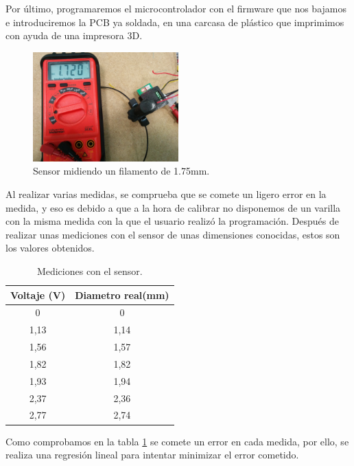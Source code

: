 Por último, programaremos el microcontrolador con el firmware que nos bajamos e introduciremos la PCB ya soldada, en una carcasa de plástico que imprimimos con ayuda de una impresora 3D.
\begin{figure}[H]
    \centering
    \includegraphics[width=0.5\textwidth]{images/sensor/IMG_20150417_134451.jpg}
    \caption{Sensor midiendo un filamento de 1.75mm.}
    \label{fig:sens_midiendo}
\end{figure}

Al realizar varias medidas, se comprueba que se comete un ligero error en la medida, y eso es debido a que a la hora de calibrar no disponemos de un varilla con la misma medida con la que el usuario realizó la programación. Después de realizar unas mediciones con el sensor de unas dimensiones conocidas, estos son los valores obtenidos.\\

\begin{table}[H]
    \centering

    \begin{tabular}{cc}
        {\bf Voltaje (V)} & {\bf Diametro real(mm)} \\ \hline
        0                 & 0                       \\
        1,13              & 1,14                    \\
        1,56              & 1,57                    \\
        1,82              & 1,82                    \\
        1,93              & 1,94                    \\
        2,37              & 2,36                    \\
        2,77              & 2,74                   
    \end{tabular}
    \caption{Mediciones con el sensor.}
    \label{tab:medici_senso}
\end{table}

Como comprobamos en la tabla \ref{tab:medici_senso} se comete un error en cada medida, por ello, se realiza una regresión lineal para intentar minimizar el error cometido.

